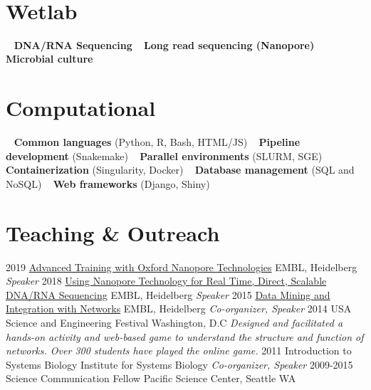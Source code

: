\documentclass[usenames,dvipsnames]{friggeri-cv}
\begin{document}
\begin{aside}
 ~
 ~
 ~
\section{Wetlab}
    ~
    \textbf{DNA/RNA Sequencing}
    ~
    \textbf{Long read sequencing (Nanopore)}
    ~
    \textbf{Microbial culture}
    ~
  \section{Computational}
   ~
    \textbf{Common languages}
    (Python, R, Bash, HTML/JS)
    ~
    \textbf{Pipeline development}
    (Snakemake)
    ~
    \textbf{Parallel environments}
     (SLURM, SGE)
    ~
    \textbf{Containerization}
    (Singularity, Docker)
    ~
    \textbf{Database management}
     (SQL and NoSQL)
    ~
    \textbf{Web frameworks }
    (Django, Shiny)
    ~
    ~
\end{aside}

\section{Teaching \& Outreach}
\begin{entrylist}
    \entry
    {2019}
    {\href{https://www.embl.de/training/events/2019/NAN19-01/programme/index.html}{Advanced Training with Oxford Nanopore Technologies}}
    {EMBL, Heidelberg}
    {\emph{Speaker}}
     \entry
    {2018}
    {\href{https://www.embl.de/training/events/2018/NAN18-01/}{Using Nanopore Technology for Real Time, Direct, Scalable DNA/RNA Sequencing}}
    {EMBL, Heidelberg}
    {\emph{Speaker}}
    \entry
    {2015}
    {\href{http://scalefreegan.github.io/Teaching/DataIntegration/}{Data Mining and Integration with Networks}}
    {EMBL, Heidelberg}
    {\emph{Co-organizer, Speaker}}
  \entry
    {2014}
    {USA Science and Engineering Festival}
    {Washington, D.C}
    {\emph{Designed and facilitated a hands-on activity and web-based game to understand the structure and function of networks. Over 300 students have played the online game.}}
  \entry
    {2011}
    {Introduction to Systems Biology}
    {Institute for Systems Biology}
    {\emph{Co-organizer, Speaker}}
    \entry
    {2009-2015}
    {Science Communication Fellow}
    {Pacific Science Center, Seattle WA}
    {}
\end{entrylist}
\end{document}
